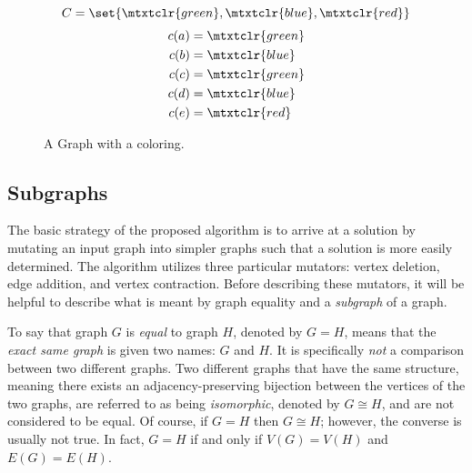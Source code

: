 \begin{figure}[H]
  \begin{minipage}{2.75in}
    \centering
  \end{minipage}
  \begin{minipage}{2.75in}
    \[C=\set{\mtxtclr{green},\mtxtclr{blue},\mtxtclr{red}}\]
    \begin{align*}
      c(a) &= \mtxtclr{green} \\
      c(b) &= \mtxtclr{blue} \\
      c(c) &= \mtxtclr{green} \\
      c(d) &= \mtxtclr{blue} \\
      c(e) &= \mtxtclr{red}
    \end{align*}
  \end{minipage}
  \caption{A Graph with a  coloring.}
  \label{fig:exchromatic}
\end{figure}

\subsection{Subgraphs}\label{sec:sub:subgraphs}

The basic strategy of the proposed algorithm is to arrive at a solution by mutating an input graph into simpler
graphs such that a solution is more easily determined.  The algorithm utilizes three particular mutators: vertex
deletion, edge addition, and vertex contraction.  Before describing these mutators, it will be helpful to describe
what is meant by graph equality and a \emph{subgraph} of a graph.

To say that graph \(G\) is \emph{equal} to graph \(H\), denoted by \(G=H\), means that the \emph{exact same graph}
is given two names: \(G\) and \(H\).  It is specifically \emph{not} a comparison between two different graphs.  Two
different graphs that have the same structure, meaning there exists an adjacency-preserving bijection between the
vertices of the two graphs, are referred to as being \emph{isomorphic}, denoted by \(G\cong H\), and are not
considered to be equal.  Of course, if \(G=H\) then \(G\cong H\); however, the converse is usually not true.  In
fact, \(G=H\) if and only if \(V(G)=V(H)\) and \(E(G)=E(H)\).

